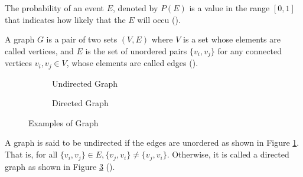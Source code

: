 The probability of an event $E$, denoted by $P(E)$ is a value in the range $[0, 1]$ that indicates how likely that the $E$ will occu (\cite{probabilitydef}).


A graph $G$ is a pair of two sets $(V, E)$ where $V$ is a set whose elements are called vertices, and $E$ is the set of unordered pairs $\{v_i, v_j\}$ for any connected vertices $v_i, v_j \in V$, whose elements are called edges (\cite{diestel2024graph}).

\begin{figure}[htb]
    \centering
    \begin{subfigure}{0.4\textwidth}
        \centering
        \caption{Undirected Graph}
        \label{fig:undirected-graph}
    \end{subfigure}
    \qquad
    \begin{subfigure}{0.4\textwidth}
        \centering
        \caption{Directed Graph}
        \label{fig:directed-graph}
    \end{subfigure}
    \caption{Examples of Graph}
\end{figure}

A graph is said to be undirected if the edges are unordered as shown in Figure \ref{fig:undirected-graph}. That is, for all $\{v_i, v_j\} \in E, \{v_j, v_i\}\neq \{v_j, v_i\}$. Otherwise, it is called a directed graph as shown in Figure \ref{fig:directed-graph} (\cite{diestel2024graph}).


